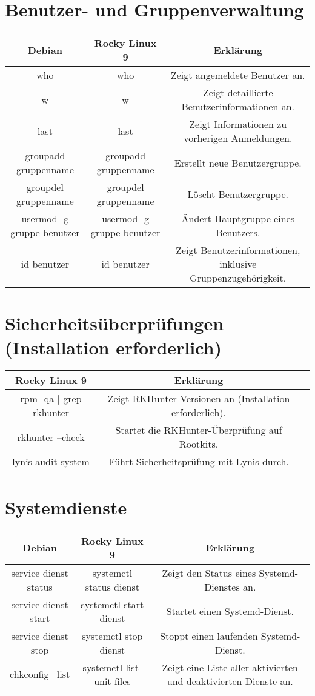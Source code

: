 \documentclass{article}
\begin{document}
\section*{Benutzer- und Gruppenverwaltung}

\begin{tabularx}{\textwidth}{CCC}
  \textbf{Debian} & \textbf{Rocky Linux 9} & \textbf{Erklärung} \\
  \hline
  who & who & Zeigt angemeldete Benutzer an. \\
  w & w & Zeigt detaillierte Benutzerinformationen an. \\
  last & last & Zeigt Informationen zu vorherigen Anmeldungen. \\
  groupadd gruppenname & groupadd gruppenname & Erstellt neue Benutzergruppe. \\
  groupdel gruppenname & groupdel gruppenname & Löscht Benutzergruppe. \\
  usermod -g gruppe benutzer & usermod -g gruppe benutzer & Ändert Hauptgruppe eines Benutzers. \\
  id benutzer & id benutzer & Zeigt Benutzerinformationen, inklusive Gruppenzugehörigkeit. \\
\end{tabularx}


\section*{Sicherheitsüberprüfungen (Installation erforderlich)}

\begin{tabularx}{\textwidth}{CCC}
  \textbf{Rocky Linux 9} & \textbf{Erklärung} \\
  \hline
  rpm -qa | grep rkhunter & Zeigt RKHunter-Versionen an (Installation erforderlich). \\
  rkhunter --check & Startet die RKHunter-Überprüfung auf Rootkits. \\
  lynis audit system & Führt Sicherheitsprüfung mit Lynis durch. \\
\end{tabularx}


\section*{Systemdienste}

\begin{tabularx}{\textwidth}{CCC}
  \textbf{Debian} & \textbf{Rocky Linux 9} & \textbf{Erklärung} \\
  \hline
  service dienst status & systemctl status dienst & Zeigt den Status eines Systemd-Dienstes an. \\
  service dienst start & systemctl start dienst & Startet einen Systemd-Dienst. \\
  service dienst stop & systemctl stop dienst & Stoppt einen laufenden Systemd-Dienst. \\
  chkconfig --list & systemctl list-unit-files & Zeigt eine Liste aller aktivierten und deaktivierten Dienste an. \\
\end{tabularx}
\end{document}
